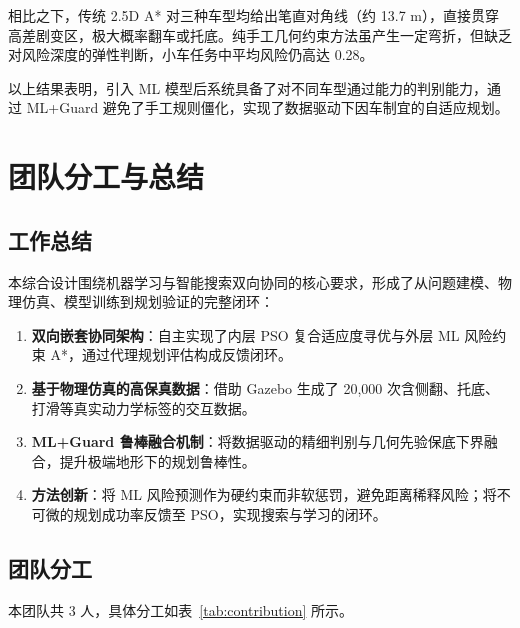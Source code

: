 \documentclass[12pt, a4paper]{article}
\begin{document}
相比之下，传统 2.5D A* 对三种车型均给出笔直对角线（约 13.7 m），直接贯穿高差剧变区，极大概率翻车或托底。纯手工几何约束方法虽产生一定弯折，但缺乏对风险深度的弹性判断，小车任务中平均风险仍高达 0.28。

以上结果表明，引入 ML 模型后系统具备了对不同车型通过能力的判别能力，通过 ML+Guard 避免了手工规则僵化，实现了数据驱动下因车制宜的自适应规划。

\section{团队分工与总结}

\subsection{工作总结}
本综合设计围绕机器学习与智能搜索双向协同的核心要求，形成了从问题建模、物理仿真、模型训练到规划验证的完整闭环：

\begin{enumerate}
    \item \textbf{双向嵌套协同架构}：自主实现了内层 PSO 复合适应度寻优与外层 ML 风险约束 A*，通过代理规划评估构成反馈闭环。
    \item \textbf{基于物理仿真的高保真数据}：借助 Gazebo 生成了 20,000 次含侧翻、托底、打滑等真实动力学标签的交互数据。
    \item \textbf{ML+Guard 鲁棒融合机制}：将数据驱动的精细判别与几何先验保底下界融合，提升极端地形下的规划鲁棒性。
    \item \textbf{方法创新}：将 ML 风险预测作为硬约束而非软惩罚，避免距离稀释风险；将不可微的规划成功率反馈至 PSO，实现搜索与学习的闭环。
\end{enumerate}

\subsection{团队分工}
本团队共 3 人，具体分工如表~\ref{tab:contribution} 所示。
\end{document}

